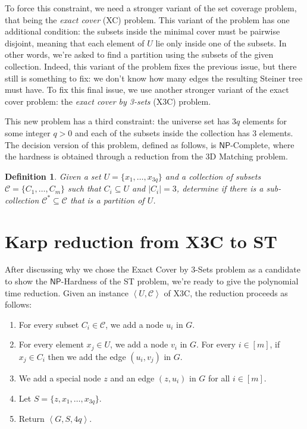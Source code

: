\documentclass[12pt,a4paper]{article}
\newtheorem{definition}{Definition}
\newcommand{\abs}[1]{\left|#1\right|}
\newcommand{\abk}[1]{\left\langle#1\right\rangle}
\begin{document}
    To force this constraint, we need a stronger variant of the set coverage problem, that being the \textit{exact cover} (XC) problem. This variant of the problem has one additional condition: the subsets inside the minimal cover must be pairwise disjoint, meaning that each element of $U$ lie only inside one of the subsets. In other words, we're asked to find a partition using the subsets of the given collection. Indeed, this variant of the problem fixes the previous issue, but there still is something to fix: we don't know how many edges the resulting Steiner tree must have. To fix this final issue, we use another stronger variant of the exact cover problem: the \textit{exact cover by 3-sets} (X3C) problem.

    This new problem has a third constraint: the universe set has $3q$ elements for some integer $q > 0$ and each of the subsets inside the collection has $3$ elements. The decision version of this problem, defined as follows, is $\mathsf{NP}$-Complete, where the hardness is obtained through a reduction from the 3D Matching problem.

    \begin{definition}
        Given a set $U = \{x_1, \ldots, x_{3q}\}$ and a collection of subsets $\mathcal{C} = \{C_1, \ldots, C_m\}$ such that $C_i \subseteq U$ and $\abs{C_i} = 3$, determine if there is a sub-collection $\mathcal{C}^* \subseteq  \mathcal{C}$ that is a partition of $U$.
    \end{definition}

    \section{Karp reduction from X3C to ST}

    After discussing why we chose the Exact Cover by 3-Sets problem as a candidate to show the $\mathsf{NP}$-Hardness of the ST problem, we're ready to give the polynomial time reduction. Given an instance $\abk{U,\mathcal{C}}$ of X3C, the reduction proceeds as follows:
    \begin{enumerate}
        \item For every subset $C_i \in \mathcal{C}$, we add a node $u_i$ in $G$.
        \item For every element $x_j \in U$, we add a node $v_i$ in $G$. For every $i \in [m]$, if $x_j \in C_i$ then we add the edge $(u_i, v_j)$ in $G$.
        \item We add a special node $z$ and an edge $(z, u_i)$ in $G$ for all $i \in [m]$.
        \item Let $S = \{z, x_1, \ldots, x_{3q}\}$.
        \item Return $\abk{G,S,4q}$.
    \end{enumerate}
\end{document}
